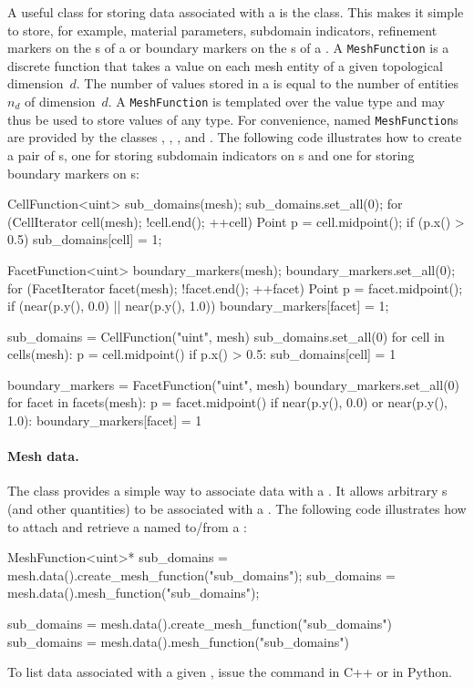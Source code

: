 A useful class for storing data associated with a  is the
 class. This makes it simple to store, for example,
material parameters, subdomain indicators, refinement markers on the
s of a  or boundary markers on the s of
a .  A \texttt{MeshFunction} is a discrete function that takes
a value on each mesh entity of a given topological dimension~$d$. The
number of values stored in a  is equal to the number
of entities $n_d$ of dimension~$d$. A \texttt{MeshFunction} is templated
over the value type and may thus be used to store values of any
type. For convenience, named \texttt{MeshFunction}s are provided by the
classes , , ,
 and .  The following code
illustrates how to create a pair of s, one for storing
subdomain indicators on s and one for storing boundary markers
on s:
\begin{c++}
CellFunction<uint> sub_domains(mesh);
sub_domains.set_all(0);
for (CellIterator cell(mesh); !cell.end(); ++cell)
{
  Point p = cell.midpoint();
  if (p.x() > 0.5)
    sub_domains[cell] = 1;
}

FacetFunction<uint> boundary_markers(mesh);
boundary_markers.set_all(0);
for (FacetIterator facet(mesh); !facet.end(); ++facet)
{
  Point p = facet.midpoint();
  if (near(p.y(), 0.0) || near(p.y(), 1.0))
    boundary_markers[facet] = 1;
}
\end{c++}
\begin{python}
sub_domains = CellFunction("uint", mesh)
sub_domains.set_all(0)
for cell in cells(mesh):
    p = cell.midpoint()
    if p.x() > 0.5:
        sub_domains[cell] = 1

boundary_markers = FacetFunction("uint", mesh)
boundary_markers.set_all(0)
for facet in facets(mesh):
    p = facet.midpoint()
    if near(p.y(), 0.0) or near(p.y(), 1.0):
        boundary_markers[facet] = 1
\end{python}


\paragraph{Mesh data.}

The  class provides a simple way to associate data with
a . It allows arbitrary s (and other
quantities) to be associated with a . The following code
illustrates how to attach and retrieve a  named
 to/from a :
\begin{c++}
MeshFunction<uint>* sub_domains = mesh.data().create_mesh_function("sub_domains");
sub_domains = mesh.data().mesh_function("sub_domains");
\end{c++}
\begin{python}
sub_domains = mesh.data().create_mesh_function("sub_domains")
sub_domains = mesh.data().mesh_function("sub_domains")
\end{python}
To list data associated with a given , issue the
command  in C++ or  in Python.

